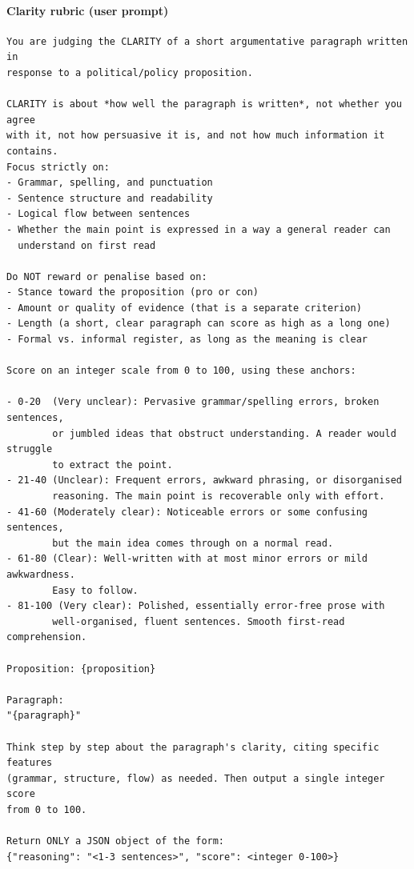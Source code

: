 \paragraph{Clarity rubric (user prompt)}
\begin{Verbatim}[breaklines=true,breakanywhere=true,fontsize=\small,frame=single,framesep=2mm]
You are judging the CLARITY of a short argumentative paragraph written in
response to a political/policy proposition.

CLARITY is about *how well the paragraph is written*, not whether you agree
with it, not how persuasive it is, and not how much information it contains.
Focus strictly on:
- Grammar, spelling, and punctuation
- Sentence structure and readability
- Logical flow between sentences
- Whether the main point is expressed in a way a general reader can
  understand on first read

Do NOT reward or penalise based on:
- Stance toward the proposition (pro or con)
- Amount or quality of evidence (that is a separate criterion)
- Length (a short, clear paragraph can score as high as a long one)
- Formal vs. informal register, as long as the meaning is clear

Score on an integer scale from 0 to 100, using these anchors:

- 0-20  (Very unclear): Pervasive grammar/spelling errors, broken sentences,
        or jumbled ideas that obstruct understanding. A reader would struggle
        to extract the point.
- 21-40 (Unclear): Frequent errors, awkward phrasing, or disorganised
        reasoning. The main point is recoverable only with effort.
- 41-60 (Moderately clear): Noticeable errors or some confusing sentences,
        but the main idea comes through on a normal read.
- 61-80 (Clear): Well-written with at most minor errors or mild awkwardness.
        Easy to follow.
- 81-100 (Very clear): Polished, essentially error-free prose with
        well-organised, fluent sentences. Smooth first-read comprehension.

Proposition: {proposition}

Paragraph:
"{paragraph}"

Think step by step about the paragraph's clarity, citing specific features
(grammar, structure, flow) as needed. Then output a single integer score
from 0 to 100.

Return ONLY a JSON object of the form:
{"reasoning": "<1-3 sentences>", "score": <integer 0-100>}
\end{Verbatim}

